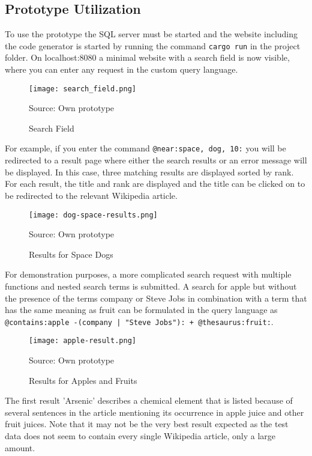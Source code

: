 \subsection{Prototype Utilization}
To use the prototype the \ac{SQL} server must be started and the website including the code generator is started by running the command \lstinline$cargo run$ in the project folder. On localhost:8080 a minimal website with a search field is now visible, where you can enter any request in the custom query language.
\begin{figure}[H]
    \caption{Search Field}
    \label{fig:search}
    \texttt{[image: search\_field.png]}
    \\
    \centerline{Source: Own prototype}
\end{figure}
For example, if you enter the command \lstinline[language=Fulltext-Search]$@near:space, dog, 10:$ you will be redirected to a result page where either the search results or an error message will be displayed. In this case, three matching results are displayed sorted by rank. For each result, the title and rank are displayed and the title can be clicked on to be redirected to the relevant Wikipedia article.
\begin{figure}[H]
    \caption{Results for Space Dogs}
    \label{fig:space-dog}
    \texttt{[image: dog-space-results.png]}
    \\
    \centerline{Source: Own prototype}
\end{figure}
For demonstration purposes, a more complicated search request with multiple functions and nested search terms is submitted. A search for apple but without the presence of the terms company or Steve Jobs in combination with a term that has the same meaning as fruit can be formulated in the query language as \lstinline[language=Fulltext-Search]$@contains:apple -(company | "Steve Jobs"): + @thesaurus:fruit:$.
\begin{figure}[H]
    \caption{Results for Apples and Fruits}
    \label{fig:apple-fruit}
    \texttt{[image: apple-result.png]}
    \\
    \centerline{Source: Own prototype}
\end{figure}
The first result 'Arsenic' describes a chemical element that is listed because of several sentences in the article mentioning its occurrence in apple juice and other fruit juices. Note that it may not be the very best result expected as the test data does not seem to contain every single Wikipedia article, only a large amount.\\
